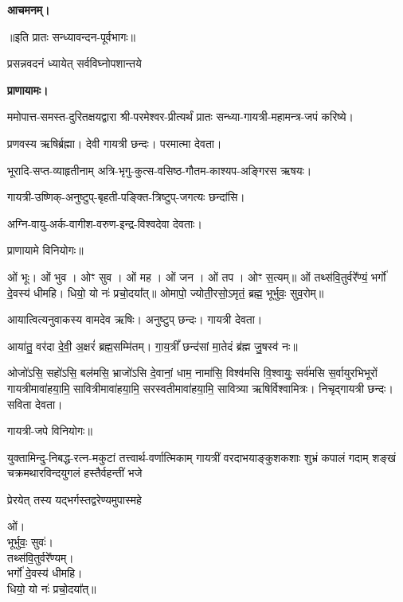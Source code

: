\textbf{आचमनम्।}


\centerline{॥इति प्रातः सन्ध्यावन्दन-पूर्वभागः॥}



{प्रसन्नवदनं ध्यायेत् सर्वविघ्नोपशान्तये}

\textbf{प्राणायामः।}

ममोपात्त-समस्त-दुरितक्षयद्वारा श्री-परमेश्वर-प्रीत्यर्थं प्रातः सन्ध्या-गायत्री-महामन्त्र-जपं करिष्ये।


प्रणवस्य ऋषिर्ब्रह्मा।
देवी गायत्री छन्दः।
परमात्मा देवता।

भूरादि-सप्त-व्याहृतीनाम् अत्रि-भृगु-कुत्स-वसिष्ठ-गौतम-काश्यप-अङ्गिरस ऋषयः।

गायत्री-उष्णिक्-अनुष्टुप्-बृहती-पङ्क्ति-त्रिष्टुप्-जगत्यः छन्दांसि।

अग्नि-वायु-अर्क-वागीश-वरुण-इन्द्र-विश्वदेवा देवताः।
      
प्राणायामे विनियोगः॥


ओं भूः। ओं भुव। ओꣳ सुव। ओं मह। ओं जन। ओं तप। ओꣳ स॒त्यम्॥
ओं तथ्स॑वि॒तुर्वरे᳚ण्यं॒ भर्गो॑ दे॒वस्य॑ धीमहि। धियो॒ यो नः॑ प्रचो॒दया᳚त्॥
ओमापो॒ ज्योती॒रसो॒ऽमृतं॒ ब्रह्म॒ भूर्भुवः॒ सुव॒रोम्॥




आयात्वित्यनुवाकस्य वामदेव ऋषिः।
अनुष्टुप् छन्दः।
गायत्री देवता।

आया॑तु॒ वर॑दा दे॒वी॒ अ॒क्षरं॑ ब्रह्म॒सम्मि॑तम्। गा॒य॒त्रीं᳚ छन्द॑सां मा॒तेदं ब्र॑ह्म जु॒षस्व॑ नः॥

ओजो॑ऽसि॒ सहो॑ऽसि॒ बल॑मसि॒ भ्राजो॑ऽसि दे॒वानां॒ धाम॒ नामा॑सि॒ विश्व॑मसि वि॒श्वायुः॒ सर्व॑मसि स॒र्वायुरभिभूरों गायत्रीमावा॑हया॒मि॒ सावित्रीमावा॑हया॒मि॒ सरस्वतीमावा॑ह\-या॒मि॒ सावित्र्या ऋषिर्विश्वामित्रः। निचृद्गायत्री छन्दः। सविता देवता।

गायत्री-जपे विनियोगः॥



{युक्तामिन्दु-निबद्ध-रत्न-मकुटां तत्त्वार्थ-वर्णात्मिकाम्}
{गायत्रीं वरदाभयाङ्कुशकशाः शुभ्रं कपालं गदाम्}
{शङ्खं चक्रमथारविन्दयुगलं हस्तैर्वहन्तीं भजे}

{प्रेरयेत् तस्य यद्भर्गस्तद्वरेण्यमुपास्महे}


ओं।\\
भूर्भुवः॒ सुवः॑।\\
तथ्स॑वि॒तुर्वरे᳚ण्यम्।\\
भर्गो॑ दे॒वस्य॑ धीमहि।\\
धियो॒ यो नः॑ प्रचो॒दया᳚त्॥

